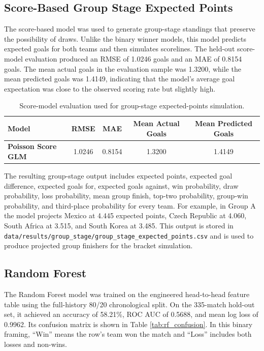 \documentclass[11pt]{article}
\newcommand{\codepath}[1]{\nolinkurl{#1}}
\begin{document}
\subsection{Score-Based Group Stage Expected Points}

The score-based model was used to generate group-stage standings that preserve the possibility of draws. Unlike the binary winner models, this model predicts expected goals for both teams and then simulates scorelines. The held-out score-model evaluation produced an RMSE of 1.0246 goals and an MAE of 0.8154 goals. The mean actual goals in the evaluation sample was 1.3200, while the mean predicted goals was 1.4149, indicating that the model's average goal expectation was close to the observed scoring rate but slightly high.

\begin{table}[h!]
\centering
\begin{tabular}{lcccc}
\hline
\textbf{Model} & \textbf{RMSE} & \textbf{MAE} & \textbf{Mean Actual Goals} & \textbf{Mean Predicted Goals} \\
\hline
\textbf{Poisson Score GLM} & 1.0246 & 0.8154 & 1.3200 & 1.4149 \\
\hline
\end{tabular}
\caption{Score-model evaluation used for group-stage expected-points simulation.}
\label{tab:score_model_metrics}
\end{table}

The resulting group-stage output includes expected points, expected goal difference, expected goals for, expected goals against, win probability, draw probability, loss probability, mean group finish, top-two probability, group-win probability, and third-place probability for every team. For example, in Group A the model projects Mexico at 4.445 expected points, Czech Republic at 4.060, South Africa at 3.515, and South Korea at 3.485. This output is stored in \codepath{data/results/group_stage/group_stage_expected_points.csv} and is used to produce projected group finishers for the bracket simulation.

\subsection{Random Forest}

The Random Forest model was trained on the engineered head-to-head feature table using the full-history 80/20 chronological split. On the 335-match hold-out set, it achieved an accuracy of 58.21\%, ROC AUC of 0.5688, and mean log loss of 0.9962. Its confusion matrix is shown in Table \ref{tab:rf_confusion}. In this binary framing, ``Win'' means the row's team won the match and ``Loss'' includes both losses and non-wins.
\end{document}
